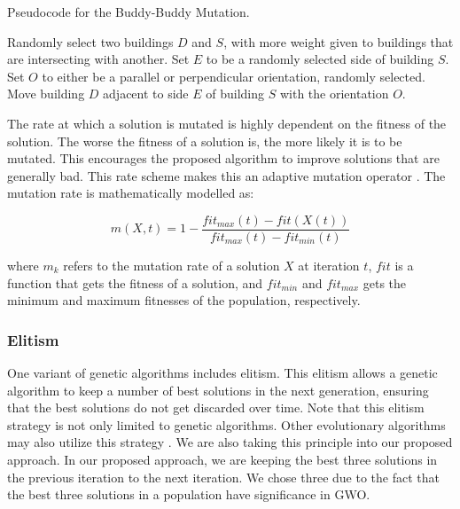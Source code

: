\begin{algorithm}
	\caption{Pseudocode for the Buddy-Buddy Mutation.}
	\label{pseudocode-buddybuddy-mutation}
	\begin{algorithmic}[1]
		\State Randomly select two buildings $D$ and $S$, with more weight given to buildings that are intersecting with another.
		\State Set $E$ to be a randomly selected side of building $S$.
		\State Set $O$ to either be a parallel or perpendicular orientation, randomly selected.
		\State Move building $D$ adjacent to side $E$ of building $S$ with the orientation $O$.
	\end{algorithmic}
\end{algorithm}

The rate at which a solution is mutated is highly dependent on the fitness of the solution. The worse the fitness of a solution is, the more likely it is to be mutated. This encourages the proposed algorithm to improve solutions that are generally bad. This rate scheme makes this an adaptive mutation operator \cite{Jiang2018}. The mutation rate is mathematically modelled as:

\begin{equation}
	m(X, t) = 1 - \frac{fit_{max}(t) - fit(X(t))}{fit_{max}(t) - fit_{min}(t)}
\end{equation}

where $m_{k}$ refers to the mutation rate of a solution $X$ at iteration $t$, $fit$ is a function that gets the fitness of a solution, and $fit_{min}$ and $fit_{max}$ gets the minimum and maximum fitnesses of the population, respectively.

\subsubsection{Elitism}
One variant of genetic algorithms includes elitism. This elitism allows a genetic algorithm to keep a number of best solutions in the next generation, ensuring that the best solutions do not get discarded over time. Note that this elitism strategy is not only limited to genetic algorithms. Other evolutionary algorithms may also utilize this strategy \cite{Du2018}. We are also taking this principle into our proposed approach. In our proposed approach, we are keeping the best three solutions in the previous iteration to the next iteration. We chose three due to the fact that the best three solutions in a population have significance in GWO.

